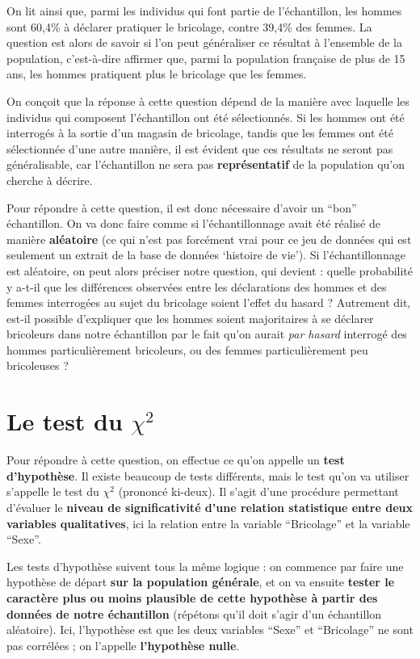 \documentclass[
  french,
]{book}
\begin{document}
On lit ainsi que, parmi les individus qui font partie de l'échantillon, les hommes sont 60,4\% à déclarer pratiquer le bricolage, contre 39,4\% des femmes. La question est alors de savoir si l'on peut généraliser ce résultat à l'ensemble de la population, c'est-à-dire affirmer que, parmi la population française de plus de 15 ans, les hommes pratiquent plus le bricolage que les femmes.

On conçoit que la réponse à cette question dépend de la manière avec laquelle les individus qui composent l'échantillon ont été sélectionnés. Si les hommes ont été interrogés à la sortie d'un magasin de bricolage, tandis que les femmes ont été sélectionnée d'une autre manière, il est évident que ces résultats ne seront pas généralisable, car l'échantillon ne sera pas \textbf{représentatif} de la population qu'on cherche à décrire.

Pour répondre à cette question, il est donc nécessaire d'avoir un ``bon'' échantillon. On va donc faire comme si l'échantillonnage avait été réalisé de manière \textbf{aléatoire} (ce qui n'est pas forcément vrai pour ce jeu de données qui est seulement un extrait de la base de données `histoire de vie'). Si l'échantillonnage est aléatoire, on peut alors préciser notre question, qui devient : quelle probabilité y a-t-il que les différences observées entre les déclarations des hommes et des femmes interrogées au sujet du bricolage soient l'effet du hasard ? Autrement dit, est-il possible d'expliquer que les hommes soient majoritaires à se déclarer bricoleurs dans notre échantillon par le fait qu'on aurait \emph{par hasard} interrogé des hommes particulièrement bricoleurs, ou des femmes particulièrement peu bricoleuses ?

\hypertarget{le-test-du-chi2}{%
\section{\texorpdfstring{Le test du \(\chi^2\)}{Le test du \textbackslash chi\^{}2}}\label{le-test-du-chi2}}

Pour répondre à cette question, on effectue ce qu'on appelle un \textbf{test d'hypothèse}. Il existe beaucoup de tests différents, mais le test qu'on va utiliser s'appelle le test du \(\chi^2\) (prononcé ki-deux). Il s'agit d'une procédure permettant d'évaluer le \textbf{niveau de significativité d'une relation statistique entre deux variables qualitatives}, ici la relation entre la variable ``Bricolage'' et la variable ``Sexe''.

Les tests d'hypothèse suivent tous la même logique : on commence par faire une hypothèse de départ \textbf{sur la population générale}, et on va ensuite \textbf{tester le caractère plus ou moins plausible de cette hypothèse à partir des données de notre échantillon} (répétons qu'il doit s'agir d'un échantillon aléatoire). Ici, l'hypothèse est que les deux variables ``Sexe'' et ``Bricolage'' ne sont pas corrélées ; on l'appelle \textbf{l'hypothèse nulle}.
\end{document}
